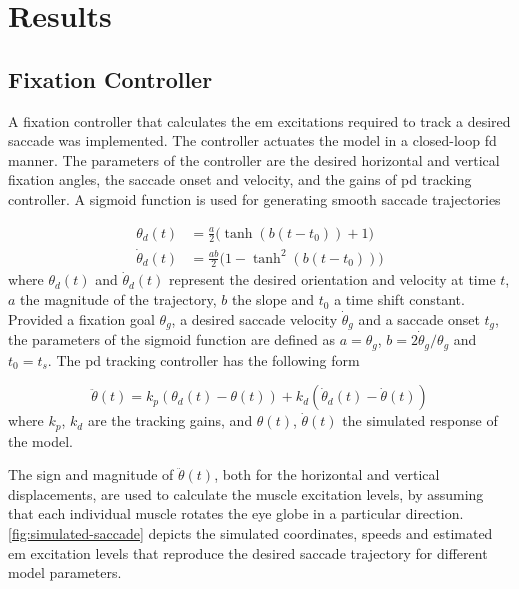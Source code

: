 \documentclass[11pt,a4paper,draft=false]{report}
\begin{document}
\section*{Results}\label{sec:results}

\subsection*{Fixation Controller}\label{sec:fixation-controller}

A fixation controller that calculates the \gls{em} excitations required to
track a desired saccade was implemented. The controller actuates the model in a
closed-loop \gls{fd} manner. The parameters of the controller are the desired
horizontal and vertical fixation angles, the saccade onset and velocity, and the
gains of \gls{pd} tracking controller. A sigmoid function is used for generating
smooth saccade trajectories

\begin{equation}\label{equ:sigmoid}
  \begin{aligned}
    \theta_d(t) &= \frac{a}{2} \Big(\tanh(b (t - t_0)) + 1\Big) \\
    \dot{\theta}_d(t) &= \frac{a b}{2} \Big(1 - \tanh^2(b (t - t_0))\Big)
  \end{aligned}
\end{equation}
% 
where $\theta_d(t)$ and $\dot{\theta}_d(t)$ represent the desired orientation
and velocity at time $t$, $a$ the magnitude of the trajectory, $b$ the slope and
$t_0$ a time shift constant. Provided a fixation goal $\theta_g$, a desired
saccade velocity $\dot{\theta}_g$ and a saccade onset $t_g$, the parameters of
the sigmoid function are defined as $a = \theta_g$,
$b = 2 \dot{\theta}_g / \theta_g$ and $t_0 = t_s$. The \gls{pd} tracking
controller has the following form

\begin{equation}\label{equ:eye-pd-controller}
  \ddot{\theta}(t) = k_p (\theta_d(t) - \theta(t)) + k_d (\dot{\theta}_d(t) -
  \dot{\theta}(t))
\end{equation}
%
where $k_p$, $k_d $ are the tracking gains, and $\theta(t)$, $\dot{\theta}(t)$
the simulated response of the model.

The sign and magnitude of $\ddot{\theta}(t)$, both for the horizontal and
vertical displacements, are used to calculate the muscle excitation levels, by
assuming that each individual muscle rotates the eye globe in a particular
direction. \autoref{fig:simulated-saccade} depicts the simulated coordinates,
speeds and estimated \gls{em} excitation levels that reproduce the desired
saccade trajectory for different model parameters.
\end{document}
